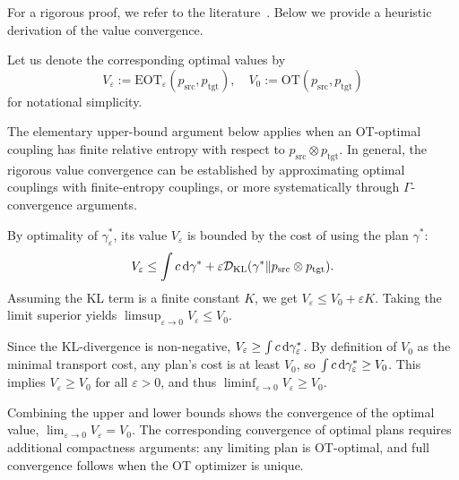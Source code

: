 {For a rigorous proof, we refer to the literature~\citep{mikami2008optimal, peyre2019computational}. Below we provide a heuristic derivation of the value convergence.

Let us denote the corresponding optimal values by
\[
V_\varepsilon := \mathrm{EOT}_\varepsilon(p_{\mathrm{src}}, p_{\mathrm{tgt}}), \quad
V_0 := \mathrm{OT}(p_{\mathrm{src}}, p_{\mathrm{tgt}})
\]
for notational simplicity. 

The elementary upper-bound argument below applies when an OT-optimal
coupling has finite relative entropy with respect to
$p_{\mathrm{src}}\otimes p_{\mathrm{tgt}}$. In general, the rigorous
value convergence can be established by approximating optimal couplings
with finite-entropy couplings, or more systematically through
$\Gamma$-convergence arguments.

 By optimality of $\gamma^*_\varepsilon$, its value $V_\varepsilon$ is bounded by the cost of using the plan $\gamma^*$:
\[
    V_\varepsilon \leq \int c  \mathop{}\!\mathrm{d}\gamma^* + \varepsilon \mathcal{D}_{\text{KL}}(\gamma^* \| p_{\mathrm{src}} \otimes p_{\mathrm{tgt}}).
\]
Assuming the KL term is a finite constant $K$, we get $V_\varepsilon \leq V_0 + \varepsilon K$. Taking the limit superior yields $\limsup_{\varepsilon \to 0} V_\varepsilon \leq V_0$.

 Since the KL-divergence is non-negative, $V_\varepsilon \geq \int c  \mathop{}\!\mathrm{d}\gamma^*_\varepsilon$. By definition of $V_0$ as the minimal transport cost, any plan's cost is at least $V_0$, so $\int c  \mathop{}\!\mathrm{d}\gamma^*_\varepsilon \geq V_0$. This implies $V_\varepsilon \geq V_0$ for all $\varepsilon > 0$, and thus $\liminf_{\varepsilon \to 0} V_\varepsilon \geq V_0$.

Combining the upper and lower bounds shows the convergence of the optimal value, $\lim_{\varepsilon \to 0} V_\varepsilon = V_0$. The corresponding convergence of optimal plans requires additional
compactness arguments: any limiting plan is OT-optimal, and full
convergence follows when the OT optimizer is unique.

 }






